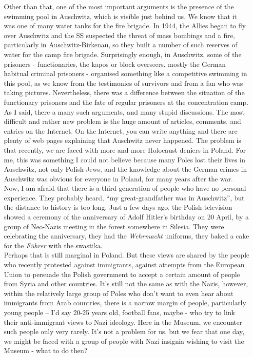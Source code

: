 Other than that, one of the most important arguments is the presence of the swimming pool in Auschwitz, which is visible just behind us. We know that it was one of many water tanks for the fire brigade. In 1944, the Allies began to fly over Auschwitz and the SS suspected the threat of mass bombings and a fire, particularly in Auschwitz-Birkenau, so they built a number of such reserves of water for the camp fire brigade. Surprisingly enough, in Auschwitz, some of the prisoners - functionaries, the kapos or block overseers, mostly the German habitual criminal prisoners - organised something like a competitive swimming in this pool, as we know from the testimonies of survivors and from a fan who was taking pictures. Nevertheless, there was a difference between the situation of the functionary prisoners and the fate of regular prisoners at the concentration camp. \\
As I said, there a many such arguments, and many stupid discussions. The most difficult and rather new problem is the huge amount of articles, comments, and entries on the Internet. On the Internet, you can write anything and there are plenty of web pages explaining that Auschwitz never happened. The problem is that recently, we are faced with more and more Holocaust deniers in Poland. For me, this was something I could not believe because many Poles lost their lives in Auschwitz, not only Polish Jews, and the knowledge about the German crimes in Auschwitz was obvious for everyone in Poland, for many years after the war. Now, I am afraid that there is a third generation of people who have no personal experience. They probably heard, ``my great-grandfather was in Auschwitz'', but the distance to history is too long. Just a few days ago, the Polish television showed a ceremony of the anniversary of Adolf Hitler's birthday on 20 April, by a group of Neo-Nazis meeting in the forest somewhere in Silesia. They were celebrating the anniversary, they had the \textit{Wehrmacht} uniforms, they baked a cake for the \textit{Führer} with the swastika.\\ 
Perhaps that is still marginal in Poland. But these views are shared by the people who recently protested against immigrants, against attempts from the European Union to persuade the Polish government to accept a certain amount of people from Syria and other countries. It's still not the same as with the Nazis, however, within the relatively large group of Poles who don't want to even hear about immigrants from Arab countries, there is a narrow margin of people, particularly young people – I’d say 20-25 years old, football fans, maybe - who try to link their anti-immigrant views to Nazi ideology. Here in the Museum, we encounter such people only very rarely. It's not a problem for us, but we fear that one day, we might be faced with a group of people with Nazi insignia wishing to visit the Museum - what to do then?\\
